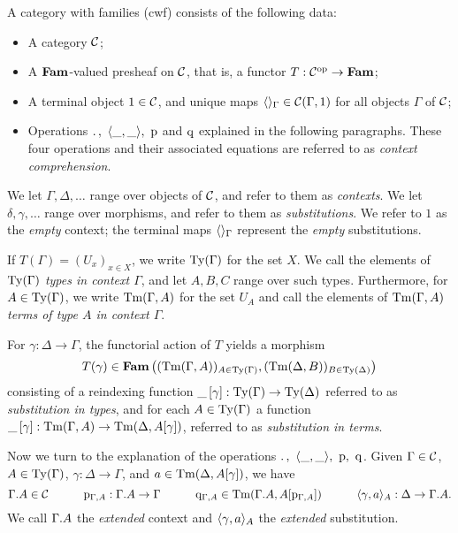 \documentclass{lmcs}
\begin{document}
\begin{definition}\label{def:Cwfobj}
A category with families (cwf) consists of the following data:

\begin{itemize}
\item A category ${\mathcal C}$;

\item A $\textbf{Fam}$-valued presheaf on ${\mathcal C}$, that is, a functor
$T : {\mathcal C}^{\text{op}} \to \textbf{Fam}$;

\item A terminal object $1\in {\mathcal C}$, and unique maps
$\langle  \rangle_\Gamma \in {\mathcal C}(\Gamma, 1)$ for all objects $\Gamma$ of ${\mathcal C}$;

\item Operations ${.\,},~\langle \_,\_ \rangle,~\mathrm{p}$ and $\mathrm{q}$
explained in the following paragraphs.
These four operations and their associated equations
are referred to as \emph{context comprehension}.
\end{itemize}

We let $\Gamma, \Delta,\ldots$ range over objects of ${\mathcal C}$,
and refer to them as \emph{contexts}.
We let $\delta, \gamma,\ldots$ range over morphisms,
and refer to them as \emph{substitutions}.
We refer to $1$ as the \emph{empty} context; the terminal maps
$\langle  \rangle_\Gamma$ represent the \emph{empty} substitutions.

If $T(\Gamma) = (U_x)_{x\in X}$, we write $\mathrm{Ty}(\Gamma)$ for the set $X$.
We call the elements of $\mathrm{Ty}(\Gamma)$ \emph{types in context $\Gamma$},
and let $A, B, C$ range over such types.
Furthermore, for $A \in \mathrm{Ty}(\Gamma)$, we write $\mathrm{Tm}(\Gamma, A)$ for the set $U_A$
and call the elements of $\mathrm{Tm}(\Gamma, A)$
\emph{terms of type $A$ in context $\Gamma$}.

For $\gamma : \Delta \to \Gamma$,
the functorial action of $T$ yields a morphism
\[
T(\gamma) \in  \Fam\left((\Tm(\Gamma, A))_{A\in \Ty(\Gamma)}, %
                (\Tm(\Delta, B))_{B\in \Ty(\Delta)}\right)
\]
consisting of a reindexing function $\_\,[\gamma] : \mathrm{Ty}(\Gamma) \to
\mathrm{Ty}(\Delta)$ referred to as \emph{substitution in types}, and for each $A\in
\mathrm{Ty}(\Gamma)$ a function $\_\,[\gamma] : \mathrm{Tm}(\Gamma, A) \to \mathrm{Tm}(\Delta,
A[\gamma])$, referred to as \emph{substitution in terms}.

Now we turn to the explanation of the operations
${.\,},~\langle \_,\_ \rangle,~\mathrm{p},~\mathrm{q}$.
Given $\Gamma \in {\mathcal C}$, $A \in \mathrm{Ty}(\Gamma)$, $\gamma : \Delta \to \Gamma$,
and $a\in \mathrm{Tm}(\Delta, A[\gamma])$, we have
\[
\Gamma . A \in {\mathcal C}
\quad\qquad
\mathrm{p}_{\Gamma, A} : \Gamma . A \to \Gamma
\quad\qquad
\mathrm{q}_{\Gamma, A} \in \mathrm{Tm}(\Gamma. A, A[\mathrm{p}_{\Gamma,A}])
\quad\qquad
\langle \gamma, a \rangle_A : \Delta \to \Gamma . A.
\]
We call $\Gamma . A$ the \emph{extended} context
and $\langle \gamma, a \rangle_A$ the \emph{extended} substitution.


\end{definition}
\end{document}
